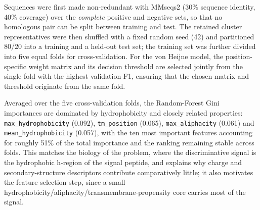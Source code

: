 %


Sequences were first made non-redundant with MMseqs2 (30\% sequence
identity, 40\% coverage) over the \emph{complete} positive and negative
sets, so that no homologous pair can be split between training and test.
The retained cluster representatives were then shuffled with a fixed
random seed (42) and partitioned 80/20 into a training and a held-out
test set; the training set was further divided into five equal folds for
cross-validation. For the von Heijne model, the position-specific weight
matrix and its decision threshold are selected jointly from the single
fold with the highest validation F1, ensuring that the chosen matrix and
threshold originate from the same fold.


Averaged over the five cross-validation folds, the Random-Forest Gini
importances are dominated by hydrophobicity and closely related
properties: \texttt{max\_hydrophobicity} (0.092), \texttt{tm\_position}
(0.065), \texttt{max\_aliphacity} (0.061) and \texttt{mean\_hydrophobicity}
(0.057), with the ten most important features accounting for roughly
51\% of the total importance and the ranking remaining stable across
folds. This matches the biology of the problem, where the discriminative
signal is the hydrophobic h-region of the signal peptide, and explains
why charge and secondary-structure descriptors contribute comparatively
little; it also motivates the feature-selection step, since a small
hydrophobicity/aliphacity/transmembrane-propensity core carries most of
the signal.


